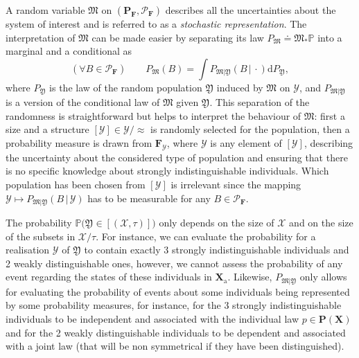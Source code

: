 \documentclass{aptpub}
\numberwithin{equation}{section}
\begin{document}
A random variable 
${\mathfrak{M}}$ 
on $({\mathbf{P}}_{\mathbf{F}},{\mathcal{P}}_{\mathbf{F}})$ describes all the uncertainties about the system of interest and is referred to as a \emph{stochastic representation}. 
The interpretation of ${\mathfrak{M}}$ can be made easier by separating its law $P_{\mathfrak{M}} {\doteq} {\mathfrak{M}}_*{\mathbb{P}}$ into a marginal and a conditional as 
{\begin{equation*}{
{({\forall B \in {\mathcal{P}}_{\mathbf{F}}})\qquad} P_{\mathfrak{M}}(B) = \int P_{{\mathfrak{M}}|{\mathfrak{Y}}}(B {\,|\,} \cdot) {\mathrm{d}} P_{\mathfrak{Y}},
}\end{equation*}}
where $P_{\mathfrak{Y}}$ is the law of the random population 
${\mathfrak{Y}}$ induced by ${\mathfrak{M}}$ on ${\boldsymbol{\mathcal{Y}}}$, and $P_{{\mathfrak{M}}|{\mathfrak{Y}}}$ is a version of the conditional law of ${\mathfrak{M}}$ given ${\mathfrak{Y}}$. This separation of the randomness is straightforward but helps to interpret the behaviour of ${\mathfrak{M}}$: first a size and a structure $[{\mathcal{Y}}] \in {\boldsymbol{\mathcal{Y}}}{/\!{\approx}}$ is randomly selected for the population, then a probability measure is drawn from ${\mathbf{F}}_{\mathcal{Y}}$, where ${\mathcal{Y}}$ is any element of $[{\mathcal{Y}}]$, describing the uncertainty about the considered type of population and ensuring that there is no specific knowledge about strongly indistinguishable individuals. Which population has been chosen from $[{\mathcal{Y}}]$ is irrelevant since the mapping ${\mathcal{Y}} \mapsto P_{{\mathfrak{M}}|{\mathfrak{Y}}}(B {\,|\,} {\mathcal{Y}})$ has to be measurable for any $B \in {\mathcal{P}}_{\mathbf{F}}$.

\begin{remark}
The probability ${\mathbb{P}}\big({\mathfrak{Y}} \in [({\mathcal{X}},\tau)] \big)$ only depends on the size of ${\mathcal{X}}$ and on the size of the subsets in ${\mathcal{X}}/\tau$. For instance, we can evaluate the probability for a realisation ${\mathcal{Y}}$ of ${\mathfrak{Y}}$ to contain exactly 3 strongly indistinguishable individuals and 2 weakly distinguishable ones, however, we cannot assess the probability of any event regarding the states of these individuals in ${\mathbf{X}}_{\mathrm{a}}$. Likewise, $P_{{\mathfrak{M}}|{\mathfrak{Y}}}$ only allows for evaluating the probability of events about some individuals being represented by some probability measures, for instance, for the 3 strongly indistinguishable individuals to be independent and associated with the individual law $p \in {\mathbf{P}}({\mathbf{X}})$ and for the 2 weakly distinguishable individuals to be dependent and associated with a joint law (that will be non symmetrical if they have been distinguished).
\end{remark}
\end{document}
